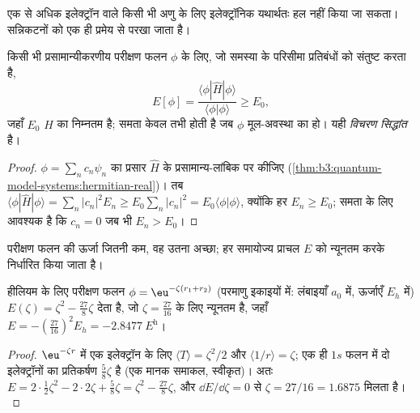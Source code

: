 एक से अधिक इलेक्ट्रॉन वाले किसी भी अणु के लिए इलेक्ट्रॉनिक 
यथार्थतः हल नहीं किया जा सकता। सन्निकटनों को एक ही
प्रमेय से परखा जाता है।

\begin{theorem}[विचरण सिद्धांत]\label{thm:b3:computational-chemistry:variational}
किसी भी प्रसामान्यीकरणीय परीक्षण फलन $\phi$ के लिए, जो समस्या के परिसीमा
प्रतिबंधों को संतुष्ट करता है,
\[
E[\phi] = \frac{\langle\phi|\hat H|\phi\rangle}{\langle\phi|\phi\rangle} \ge E_0,
\]
जहाँ $E_0$  $\hat H$ का निम्नतम  है; समता केवल तभी होती है जब $\phi$
मूल-अवस्था का  हो। यही \emph{विचरण
सिद्धांत} है।
\end{theorem}

\begin{proof}
$\phi = \sum_nc_n\psi_n$ का प्रसार $\hat H$ के प्रसामान्य-लांबिक  पर कीजिए
(\cref{thm:b3:quantum-model-systems:hermitian-real})। तब $\langle\phi|\hat
H|\phi\rangle = \sum_n|c_n|^2E_n \ge E_0\sum_n|c_n|^2 = E_0\langle\phi|\phi\rangle$,
क्योंकि हर $E_n \ge E_0$; समता के लिए आवश्यक है कि $c_n = 0$ जब भी $E_n > E_0$।
\end{proof}

परीक्षण फलन की ऊर्जा जितनी कम, वह उतना अच्छा; हर समायोज्य
प्राचल $E$ को न्यूनतम करके निर्धारित किया जाता है।

\begin{proposition}[आवरित आवेश वाला हीलियम]\label{prop:b3:computational-chemistry:helium-zeta}
हीलियम के लिए परीक्षण फलन $\phi = \eu^{-\zeta(r_1 + r_2)}$ (परमाणु इकाइयों में:
लंबाइयाँ $a_0$ में, ऊर्जाएँ $E_h$ में) $E(\zeta) = \zeta^2 - \frac{27}{8}\zeta$ देता है,
जो $\zeta = \frac{27}{16}$ के लिए न्यूनतम है, जहाँ $E = -(\frac{27}{16})^2 E_h =
\qty{-2.8477}{\hartree}$।
\end{proposition}

\begin{proof}
$\eu^{-\zeta r}$ में एक इलेक्ट्रॉन के लिए $\langle T\rangle = \zeta^2/2$ और
$\langle 1/r\rangle = \zeta$; एक ही $1s$
फलन में दो इलेक्ट्रॉनों का प्रतिकर्षण $\frac58\zeta$ है (एक मानक समाकल, स्वीकृत)। अतः $E = 2\cdot\frac12
\zeta^2 - 2\cdot2\zeta + \frac58\zeta = \zeta^2 - \frac{27}{8}\zeta$, और $\dd E/\dd
\zeta = 0$ से $\zeta = 27/16 = 1.6875$ मिलता है।
\end{proof}

